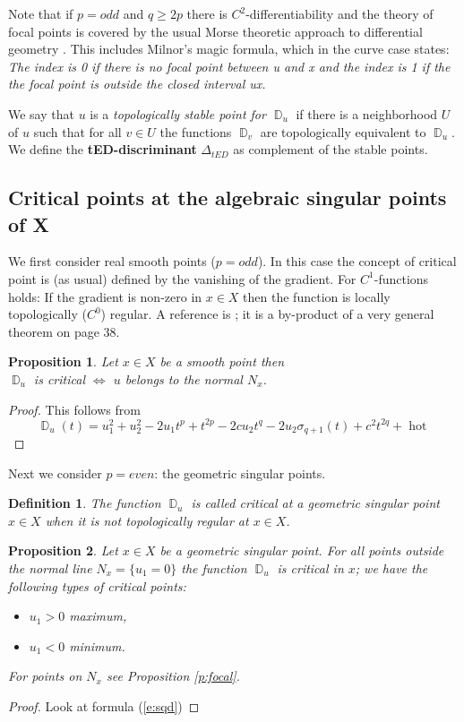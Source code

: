 \documentclass[12pt,a4,twoside]{amsart}
\DeclareMathOperator{\sq}{\mathbb{D}}
\DeclareMathOperator{\hot}{hot}
\newtheorem{prop}{Proposition}
\newtheorem*{main lemma}{The main lemma}
\newtheorem{definition}{Definition}
\begin{document}
Note that if $p=odd$ and $q \ge 2p$ there is  $C^2$-differentiability and the theory of focal points  is covered by the usual Morse theoretic approach to differential geometry \cite{Milnor}. This includes Milnor's magic formula, which in the curve case states:
{\em The index is 0 if there is no focal point between u and x and the index is 1  if the the focal point is outside the closed interval ux. }


We say that $u$ is a \textit{topologically stable point for $\sq_u$} if there is a neighborhood $U$ of $u$ such that for all $v \in U$ the
functions $\sq_v$ are topologically equivalent to $\sq_u$. We define the {\bf tED-discriminant} $\Delta_{tED}$ as complement of the stable points. 


\subsection{Critical points at the algebraic singular points of X}
We first consider real smooth points  ($p = odd$). In this case the concept of critical point is (as usual) defined by the vanishing of the gradient. For $C^1$-functions holds:
If the gradient is non-zero in $x \in X$  then the function is locally topologically ($C^0$) regular. A reference is \cite{CE}; 
it is a by-product of a very general theorem on page 38. 

\begin{prop}\label{p:oddcrpt} Let  $x \in X$ be a  smooth point then\\
$ \sq_u$ is critical $\Longleftrightarrow$  $u$ belongs to the normal $N_x$.
\end{prop}
\begin{proof}
This follows from 
\begin{equation}\label{e:sqd}
\sq_u(t)  = u_1^2 + u_2^2 - 2u_1 t^p + t^{2p}  - 2 c u_2 t^q    -2 u_2 \sigma_{q+1}(t)   + c^2 t^{2q} + \hot  
\end{equation}

\end{proof}

Next we consider  $p = even$: the geometric  singular points.
\begin{definition}
The function $\sq_u$ is called critical at a  geometric singular point $x \in X$ when it is not topologically regular at $x \in X$.


\end{definition}


\begin{prop}\label{l:outofnormal}
Let $x \in X$ be a geometric singular point.
For all points outside the normal  line $N_x = \{u_1=0\}$ the function $\sq_u$ is critical
 in $x$; we have the following types of critical points:
\begin{itemize}
\item $u_1 > 0$ maximum,
\item $u_1 < 0$ minimum.
\end{itemize}
For points on  $N_x$ see Proposition \ref{p:focal}.
\end{prop}
\begin{proof}
Look at formula (\ref{e:sqd})
\end{proof}
\end{document}
